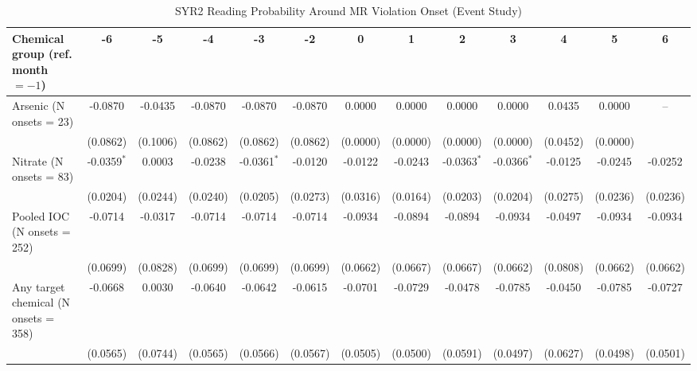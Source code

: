 \begin{table}[htbp]
   \caption{\label{tab:mr_reading_event_study} SYR2 Reading Probability Around MR Violation Onset (Event Study)}
   \bigskip
   \centering
   \begin{adjustbox}{width = \textwidth, center}
      \begin{tabular}{lcccccccccccc}
         \toprule
         Chemical group (ref. month $=-1$) & -6 & -5 & -4 & -3 & -2 & 0 & 1 & 2 & 3 & 4 & 5 & 6 \\
         \midrule
         Arsenic (N onsets = 23) & -0.0870 & -0.0435 & -0.0870 & -0.0870 & -0.0870 & 0.0000 & 0.0000 & 0.0000 & 0.0000 & 0.0435 & 0.0000 & -- \\
          & (0.0862) & (0.1006) & (0.0862) & (0.0862) & (0.0862) & (0.0000) & (0.0000) & (0.0000) & (0.0000) & (0.0452) & (0.0000) &  \\
         Nitrate (N onsets = 83) & -0.0359$^{*}$ & 0.0003 & -0.0238 & -0.0361$^{*}$ & -0.0120 & -0.0122 & -0.0243 & -0.0363$^{*}$ & -0.0366$^{*}$ & -0.0125 & -0.0245 & -0.0252 \\
          & (0.0204) & (0.0244) & (0.0240) & (0.0205) & (0.0273) & (0.0316) & (0.0164) & (0.0203) & (0.0204) & (0.0275) & (0.0236) & (0.0236) \\
         Pooled IOC (N onsets = 252) & -0.0714 & -0.0317 & -0.0714 & -0.0714 & -0.0714 & -0.0934 & -0.0894 & -0.0894 & -0.0934 & -0.0497 & -0.0934 & -0.0934 \\
          & (0.0699) & (0.0828) & (0.0699) & (0.0699) & (0.0699) & (0.0662) & (0.0667) & (0.0667) & (0.0662) & (0.0808) & (0.0662) & (0.0662) \\
         Any target chemical (N onsets = 358) & -0.0668 & 0.0030 & -0.0640 & -0.0642 & -0.0615 & -0.0701 & -0.0729 & -0.0478 & -0.0785 & -0.0450 & -0.0785 & -0.0727 \\
          & (0.0565) & (0.0744) & (0.0565) & (0.0566) & (0.0567) & (0.0505) & (0.0500) & (0.0591) & (0.0497) & (0.0627) & (0.0498) & (0.0501) \\
         \bottomrule
      \end{tabular}
   \end{adjustbox}

\end{table}
